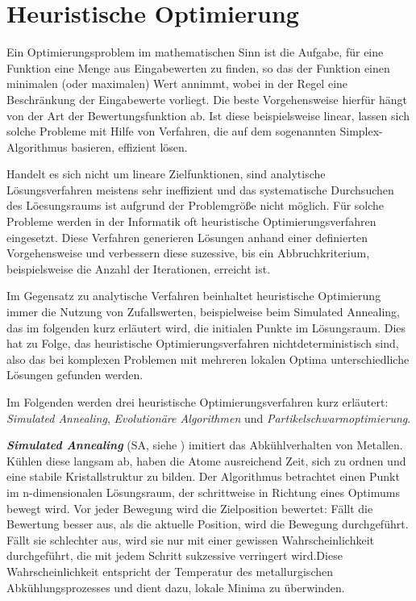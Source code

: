 \section{Heuristische Optimierung}
\label{opti}

Ein Optimierungsproblem im mathematischen Sinn ist die Aufgabe, für eine Funktion eine Menge aus Eingabewerten zu finden, so das der Funktion einen minimalen (oder maximalen) Wert annimmt, wobei in der Regel eine Beschr\"ankung der Eingabewerte vorliegt. Die beste Vorgehensweise hierf\"ur h\"angt von der Art der Bewertungsfunktion ab. Ist diese beispielsweise linear, lassen sich solche Probleme mit Hilfe von Verfahren, die auf dem  sogenannten Simplex-Algorithmus basieren, effizient l\"osen.

Handelt es sich nicht um lineare Zielfunktionen, sind analytische L\"osungsverfahren meistens sehr ineffizient und das systematische Durchsuchen des L\"oesungsraums ist aufgrund der Problemgr\"o{\ss}e nicht m\"oglich. F\"ur solche Probleme werden in der Informatik oft heuristische Optimierungsverfahren eingesetzt. Diese Verfahren generieren L\"osungen anhand einer definierten Vorgehensweise und verbessern diese suzessive, bis ein Abbruchkriterium, beispielsweise die Anzahl der Iterationen, erreicht ist. 

Im Gegensatz zu analytische Verfahren beinhaltet heuristische Optimierung immer die Nutzung von Zufallswerten, beispielweise beim Simulated Annealing, das im folgenden kurz erl\"autert wird, die initialen Punkte im L\"osungsraum. Dies hat zu Folge, das heuristische Optimierungsverfahren nichtdeterministisch sind, also das bei komplexen Problemen mit mehreren lokalen Optima unterschiedliche L\"osungen gefunden werden. 

Im Folgenden werden drei heuristische Optimierungsverfahren kurz erl\"autert: \textit{Simulated Annealing}, \textit{Evolution\"are Algorithmen} und \textit{Partikelschwarmoptimierung}. 

\textbf{\textit{Simulated Annealing}} (SA, siehe \cite{Kirkpatrik}) imitiert das Abkühlverhalten von Metallen. Kühlen diese langsam ab, haben die Atome ausreichend Zeit, sich zu ordnen und eine stabile Kristallstruktur zu bilden. Der Algorithmus betrachtet einen Punkt im n-dimensionalen L\"osungsraum, der schrittweise in Richtung eines Optimums bewegt wird. Vor jeder Bewegung wird die Zielposition bewertet: Fällt die Bewertung besser aus, als die aktuelle Position, wird die Bewegung durchgeführt. Fällt sie schlechter aus, wird sie nur mit einer gewissen Wahrscheinlichkeit durchgef\"uhrt, die mit jedem Schritt sukzessive verringert wird.Diese Wahrscheinlichkeit entspricht der Temperatur des metallurgischen Abkühlungsprozesses und dient dazu, lokale Minima zu \"uberwinden.

